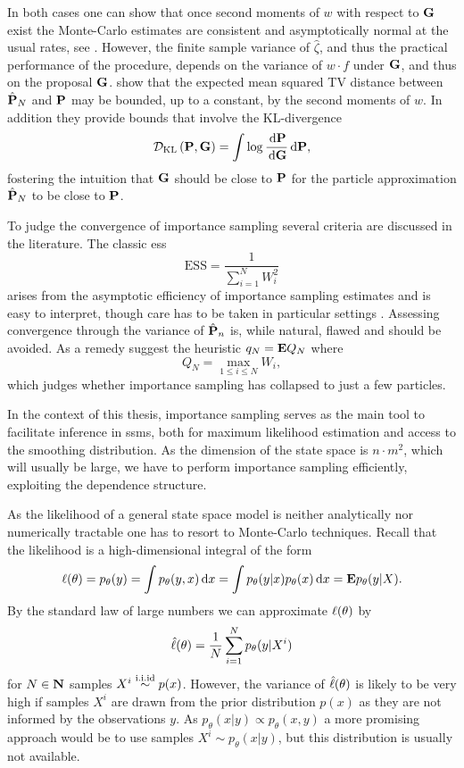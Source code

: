 In both cases one can show that once second moments of $w$ with respect to $\G$ exist the Monte-Carlo estimates are consistent and asymptotically normal at the usual rates, see \cite[Chapter 8]{Chopin2020Introduction}. 
However, the finite sample variance of $\hat\zeta$, and thus the practical performance of the procedure, depends on the variance of $w\cdot f$ under $\G$, and thus on the proposal $\G$. \citep{Agapiou2017Importance} show that  the expected mean squared TV distance  between $\hat \P_N$ and  $\P$ may be bounded, up to a constant, by the second moments of $w$. In addition they provide bounds that involve the KL-divergence 
$$
\mathcal D_{\text{KL}} \left(\P, \G\right) = \int \log \frac{\d \P}{\d \G} \d \P,
$$
fostering the intuition that $\G$ should be close to $\P$ for the particle approximation $\hat\P_{N}$ to be close to $\P$.

To judge the convergence of importance sampling several criteria are discussed in the literature. The classic \gls{ess}\cite{Kong1994Sequential} 
$$
\text{ESS} = \frac{1}{\sum_{i = 1}^N W^{2}_{i}}
$$
arises from the asymptotic efficiency of importance sampling estimates and is easy to interpret, though care has to be taken in particular settings . Assessing convergence through the variance of $\hat \P_{n}$ is, while natural, flawed \cite{Chatterjee2018Sample} and should be avoided. As a remedy \cite{Chatterjee2018Sample} suggest the heuristic $q_{N} = \E Q_{N}$ where
$$
Q_{N} = \max_{1\leq i\leq N} W_{i},
$$
which judges whether importance sampling has collapsed to just a few particles.


In the context of this thesis, importance sampling serves as the main tool to facilitate inference in \glspl{ssm}, both for maximum likelihood estimation and access to the smoothing distribution. As the dimension of the state space is $n\cdot m^{2}$, which will usually be large, we have to perform importance sampling efficiently, exploiting the dependence structure. 

As the likelihood of a general state space model is neither analytically nor numerically tractable one has to resort to Monte-Carlo techniques.
Recall that the likelihood is a high-dimensional integral of the form
\begin{align*}
    \lik(\theta) = p_\theta(y) = \int p_\theta(y,x) \d x = \int p_\theta(y|x) p_\theta(x) \d x = \E p_\theta(y|X).
\end{align*}
By the standard law of large numbers we can approximate $\lik(\theta)$ by
\begin{align*}
    \hat\lik(\theta) = \frac 1 N \sum_{i=1}^N p_\theta(y|X^i)
\end{align*}
for $N\in\N$ samples $X^i \iid p(x)$.
However, the variance of $\hat\lik(\theta)$ is likely to be very high if samples $X^i$ are drawn from the prior distribution $p(x)$ as they are not informed by the observations $y$.
As $p_\theta(x|y) \propto p_\theta(x,y)$ a more promising approach would be to use samples $X^i \sim p_\theta(x|y)$, but this distribution is usually not available.

